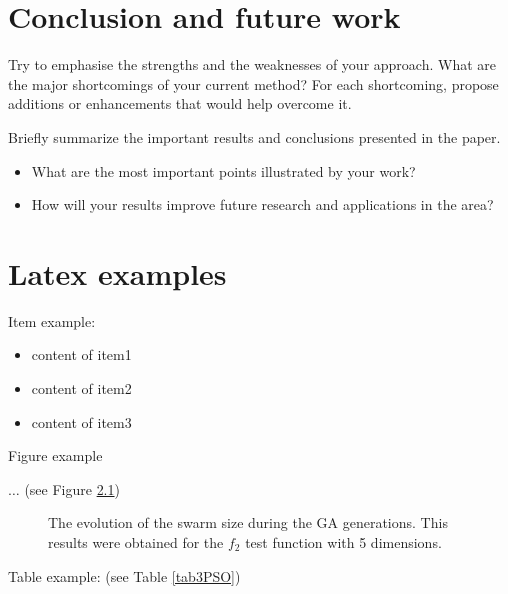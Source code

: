 \documentclass[runningheads,a4paper,11pt]{report}
\begin{document}
\chapter{Conclusion and future work}
\label{chapter:concl}

Try to emphasise the strengths and the weaknesses of your approach.
What are the major shortcomings of your current method? For each shortcoming, propose additions or enhancements that would help overcome it. 

Briefly summarize the important results and conclusions presented in the paper. 

\begin{itemize}
	\item What are the most important points illustrated by your work? 
	\item How will your results improve future research and applications in the area? 
\end{itemize}


\chapter{Latex examples}

Item example: 

\begin{itemize}
	\item content of item1
 	\item content of item2
 	\item content of item3
\end{itemize}



Figure example 

$\ldots$ (see Figure \ref{swarmsize})

\begin{figure}[htbp]
	\caption{The evolution of the swarm size during the GA generations. This results were obtained for the $f_2$ test function with 5 dimensions.}
	\label{swarmsize}
\end{figure}


Table example: (see Table \ref{tab3PSO})
\end{document}
